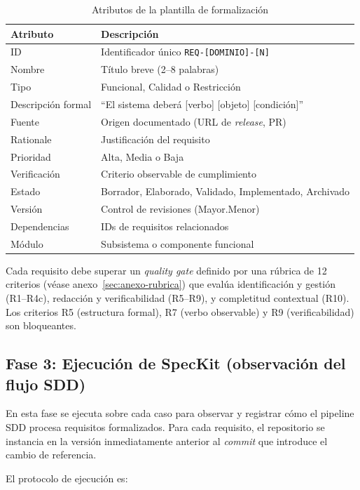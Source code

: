 \begin{table}[h]
\centering
\caption{Atributos de la plantilla de formalizaci\'on}
\label{tab:atributos}
\begin{tabularx}{\textwidth}{lX}
\toprule
\textbf{Atributo} & \textbf{Descripci\'on} \\
\midrule
ID & Identificador \'unico \texttt{REQ-[DOMINIO]-[N]} \\
Nombre & T\'itulo breve (2--8 palabras) \\
Tipo & Funcional, Calidad o Restricci\'on \\
Descripci\'on formal & ``El sistema deber\'a [verbo] [objeto] [condici\'on]'' \\
Fuente & Origen documentado (URL de \emph{release}, PR) \\
Rationale & Justificaci\'on del requisito \\
Prioridad & Alta, Media o Baja \\
Verificaci\'on & Criterio observable de cumplimiento \\
Estado & Borrador, Elaborado, Validado, Implementado, Archivado \\
Versi\'on & Control de revisiones (Mayor.Menor) \\
Dependencias & IDs de requisitos relacionados \\
M\'odulo & Subsistema o componente funcional \\
\bottomrule
\end{tabularx}
\end{table}

Cada requisito debe superar un \emph{quality gate} definido por una r\'ubrica de 12 criterios (v\'ease anexo~\ref{sec:anexo-rubrica}) que eval\'ua identificaci\'on y gesti\'on (R1--R4c), redacci\'on y verificabilidad (R5--R9), y completitud contextual (R10). Los criterios R5 (estructura formal), R7 (verbo observable) y R9 (verificabilidad) son bloqueantes.

\subsection{Fase 3: Ejecuci\'on de SpecKit (observaci\'on del flujo SDD)}

En esta fase se ejecuta \speckit{} sobre cada caso para observar y registrar c\'omo el pipeline SDD procesa requisitos formalizados. Para cada requisito, el repositorio se instancia en la versi\'on inmediatamente anterior al \emph{commit} que introduce el cambio de referencia.

El protocolo de ejecuci\'on es:

